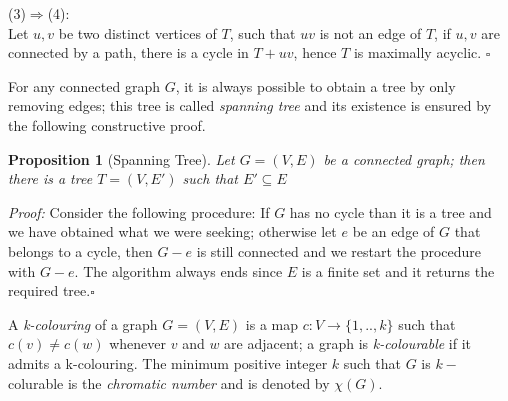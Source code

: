 \documentclass[a4paper,12pt,oneside]{book}
\newtheorem{proposition}[theorem]{Proposition}
\newcommand*{\QED}{\hfill\ensuremath{\square}}
\begin{document}
(3)$\Rightarrow$(4):\\
Let $u,v$ be two distinct vertices of $T$, such that $uv$ is not an edge of $T$, if $u,v$ are connected by a path, there is a cycle in $T+uv$, hence $T$ is maximally acyclic. \QED

 For any connected graph $G$, it is always possible to obtain a tree by only removing edges; this tree is called \textit{spanning tree} and its existence is ensured by the following constructive proof.
\begin{proposition}[Spanning Tree]
Let $G=(V,E)$ be a connected graph; then there is a tree $T=(V,E')$ such that $E'\subseteq E$
\end{proposition}
\textit{Proof:}
Consider the following procedure: If $G$ has no cycle than it is a tree and we have obtained what we were seeking; otherwise let $e$ be an edge of $G$ that belongs to a cycle, then $G-e$ is still connected and we restart the procedure with $G-e$.
The algorithm always ends since $E$ is a finite set and it returns the required tree.\QED


A \textit{k-colouring} of a graph $G=(V,E)$ is a map $c:V \rightarrow \{1,..,k\} $ such that $c(v) \neq c(w) $ whenever $v$ and $w$ are adjacent; a graph is \textit{k-colourable} if it admits a k-colouring. The minimum positive integer $k$ such that $G$ is $k-$colurable is the \textit{chromatic number} and is denoted by $\chi (G)$.
\end{document}
